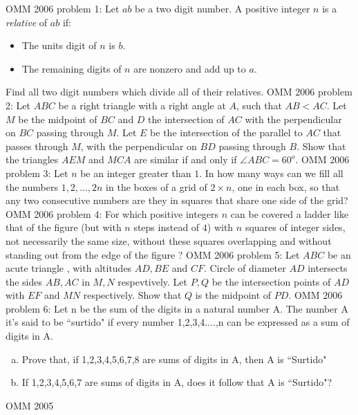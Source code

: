 OMM 2006 problem 1:  Let $ab$ be a two digit number. A positive integer $n$ is a \textit{relative} of $ab$ if:
\begin{itemize}
  \item The units digit of $n$ is $b$.
  \item The remaining digits of $n$ are nonzero and add up to $a$.
\end{itemize}
Find all two digit numbers which divide all of their relatives. 
OMM 2006 problem 2:  Let $ABC$ be a right triangle with a right angle at $A$, such that $AB < AC$. Let $M$ be the midpoint of $BC$ and $D$ the intersection of $AC$ with the perpendicular on $BC$ passing through $M$. Let $E$ be the intersection of the parallel to $AC$ that passes through $M$, with the perpendicular on $BD$ passing through $B$. Show that the triangles  $AEM$ and $MCA$ are similar if and only if $\angle ABC = 60^o$. 
OMM 2006 problem 3:  Let $n$ be an integer greater than $1$. In how many ways can we fill all the numbers $1, 2,..., 2n$ in the boxes of a grid of $2\times n$, one in each box, so that any two consecutive numbers are they in squares that share one side of the grid? 
OMM 2006 problem 4:  For which positive integers $n$ can be covered a ladder like that of the figure (but with $n$ steps instead of $4$) with $n$ squares of integer sides, not necessarily the same size, without these squares overlapping and without standing out from the edge of the figure ? 
OMM 2006 problem 5:  Let $ABC$ be an acute triangle , with altitudes $AD,BE$ and $CF$. Circle of diameter $AD$ intersects the sides $AB,AC$ in $M,N$ respevtively. Let $P,Q$ be the intersection points of $AD$ with $EF$ and $MN$ respectively. Show that $Q$ is the midpoint of $PD$. 
OMM 2006 problem 6:  Let n be the sum of the digits in a natural number A. The number A it's said to be ``surtido" if every number 1,2,3,4....,n can be expressed as a sum of digits in A.
\begin{enumerate}[a)]
  \item Prove that, if 1,2,3,4,5,6,7,8 are sums of digits in A, then A is ``Surtido"
  \item If 1,2,3,4,5,6,7 are sums of digits in A, does it follow that A is ``Surtido"?
\end{enumerate} 

OMM 2005 

